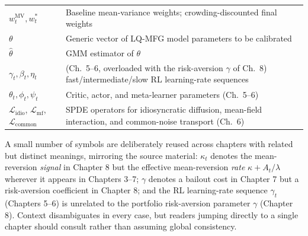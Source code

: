 \begin{table}[ht]
\begin{tabular}{p{2.6cm}p{9.5cm}}
$w_t^{\mathrm{MV}}, w_t^*$ & Baseline mean-variance weights; crowding-discounted
    final weights \\
$\theta$ & Generic vector of LQ-MFG model parameters to be calibrated \\
$\hat\theta$ & GMM estimator of $\theta$ \\
$\gamma_t, \beta_t, \eta_t$ & (Ch.\ 5--6, overloaded with the risk-aversion
    $\gamma$ of Ch.\ 8) fast/intermediate/slow RL learning-rate sequences \\
$\theta_t, \phi_t, \psi_t$ & Critic, actor, and meta-learner parameters
    (Ch.\ 5--6) \\
$\mathcal{L}_{\mathrm{idio}}$, $\mathcal{L}_{\mathrm{mf}}$,
    $\mathcal{L}_{\mathrm{common}}$
    & SPDE operators for idiosyncratic diffusion, mean-field interaction, and
    common-noise transport (Ch.\ 6) \\
\bottomrule
\end{tabular}
\end{table}

\begin{remark}
A small number of symbols are deliberately reused across chapters with related
but distinct meanings, mirroring the source material: $\kappa_t$ denotes the
mean-reversion \emph{signal} in Chapter 8 but the effective mean-reversion
\emph{rate} $\kappa + A_t/\lambda$ wherever it appears in Chapters 3--7; $\gamma$
denotes a bailout cost in Chapter 7 but a risk-aversion coefficient in Chapter 8;
and the RL learning-rate sequence $\gamma_t$ (Chapters 5--6) is unrelated to the
portfolio risk-aversion parameter $\gamma$ (Chapter 8). Context disambiguates in
every case, but readers jumping directly to a single chapter should consult
 rather than assuming global consistency.
\end{remark}
